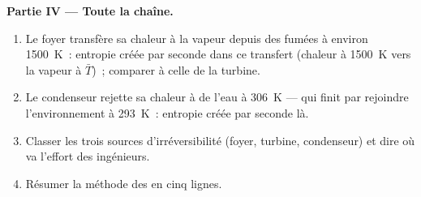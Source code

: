 \begin{problem}
\textbf{Partie IV --- Toute la chaîne.}
\begin{enumerate}[resume]
  \item Le foyer transfère sa chaleur à la vapeur depuis des fumées à
        environ \qty{1500}{K}~: entropie créée par seconde dans ce transfert
        (chaleur à \qty{1500}{K} vers la vapeur à $\bar T$)~; comparer à celle de la
        turbine.
  \item Le condenseur rejette sa chaleur à de l'eau à \qty{306}{K} ---
        qui finit par rejoindre l'environnement à \qty{293}{K}~: entropie
        créée par seconde là.
  \item Classer les trois sources d'irréversibilité (foyer, turbine,
        condenseur) et dire où va l'effort des ingénieurs.
  \item Résumer la méthode des  en cinq lignes.
\end{enumerate}
\end{problem}
